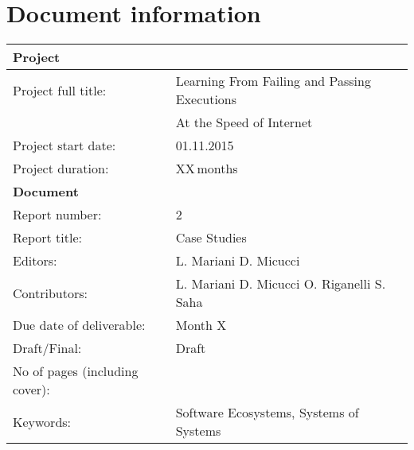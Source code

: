 \documentclass[a4paper,oneside]{scrreprt}
\begin{document}
\maketitle

\chapter*{Document information}\label{docInfo}
 \begin{tabular}[t]{|l|l|}
   \hline
   \multicolumn{2}{|l|}{\bf Project} \\ \hline
   Project full title: & Learning From Failing and Passing Executions\\ 
    &  At the Speed of Internet\\ \hline
   Project start date: & 01.11.2015 \\ \hline
   Project duration: & XX\,months \\ \hline

   \multicolumn{2}{|l|}{\bf Document} \\ \hline
   Report number: & 2\\ \hline
   Report title: & Case Studies\\ \hline
   Editors: & L. Mariani D. Micucci \\ \hline
   Contributors: & L. Mariani  D. Micucci O. Riganelli S. Saha \\ \hline
   Due date of deliverable: & Month X\\ \hline
   Draft/Final: & Draft\\ \hline
   No of pages (including cover): & \pageref{LastPage} \\ \hline
   Keywords: & Software Ecosystems, Systems of Systems\\ \hline
\end{tabular}
\newpage
\end{document}

